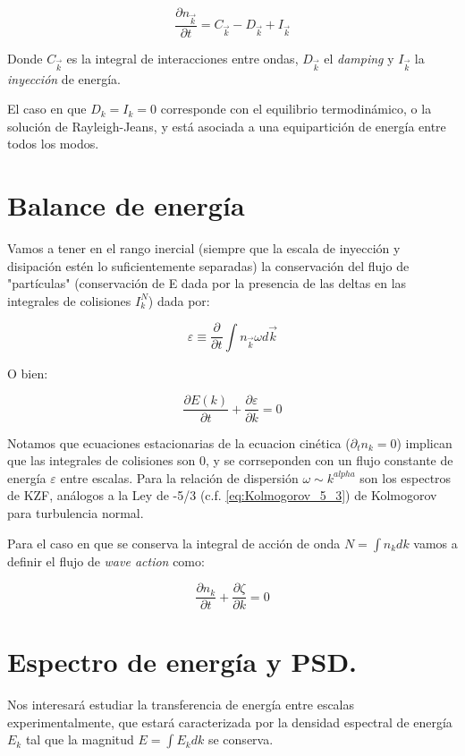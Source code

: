 \begin{equation}
	\frac{\partial n_{\vec k}}{\partial t} = C_{\vec k} - D_{\vec k} + I_{\vec k}
\end{equation}

Donde $C_{\vec k}$ es la integral de interacciones entre ondas, $D_{\vec k}$ el \textit{damping} y $I_{\vec k}$ la \textit{inyección} de energía.

El caso en que $D_k=I_k=0$ corresponde con el equilibrio termodinámico, o la solución de Rayleigh-Jeans, y está asociada a una equipartición de energía entre todos los modos.


\section*{Balance de energía}
Vamos a tener en el rango inercial (siempre que la escala de inyección y disipación estén lo suficientemente separadas) la conservación del flujo de "partículas" (conservación de E dada por la presencia de las deltas en las integrales de colisiones $I_k^N$) dada por:

\begin{equation}
	\varepsilon \equiv \frac{\partial }{\partial t} \int n_{\vec k} \omega d\vec k 
\end{equation}

O bien:

\begin{equation}
	\frac{\partial E(k)}{\partial t} + \frac{\partial \varepsilon}{\partial k} = 0
	\label{eq:energy_balance}
\end{equation}

Notamos que ecuaciones estacionarias de la ecuacion cinética ($\partial_tn_k = 0$) implican que las integrales de colisiones son 0, y se corrseponden con un flujo constante de energía $\varepsilon$ entre escalas. Para la relación de dispersión $\omega\sim k^{alpha}$ son los espectros de KZF, análogos a la Ley de -5/3 (c.f. \eqref{eq:Kolmogorov_5_3}) de Kolmogorov para turbulencia normal.

Para el caso en que se conserva la integral de acción de onda $N=\int n_k dk$ vamos a definir el flujo de \textit{wave action} como:

\begin{equation}
	\frac{\partial n_k}{\partial t} + \frac{\partial \zeta}{\partial k} = 0
\end{equation}


\section{Espectro de energía y PSD.}
Nos interesará estudiar la transferencia de energía entre escalas experimentalmente, que estará caracterizada por la densidad espectral de energía $E_k$ tal que la magnitud $E = \int E_k dk$ se conserva. 

